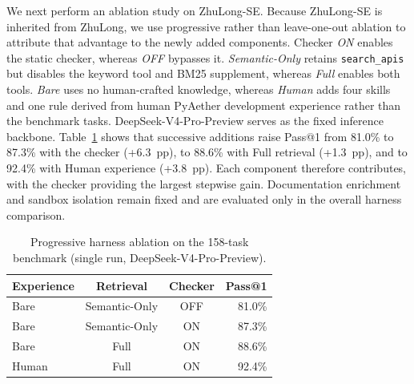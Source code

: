 We next perform an ablation study on ZhuLong-SE. Because ZhuLong-SE is inherited from ZhuLong, we use progressive rather than leave-one-out ablation to attribute that advantage to the newly added components. Checker \emph{ON} enables the static checker, whereas \emph{OFF} bypasses it. \emph{Semantic-Only} retains \texttt{search\_apis} but disables the keyword tool and BM25 supplement, whereas \emph{Full} enables both tools. \emph{Bare} uses no human-crafted knowledge, whereas \emph{Human} adds four skills and one rule derived from human PyAether development experience rather than the benchmark tasks. DeepSeek-V4-Pro-Preview serves as the fixed inference backbone. Table~\ref{tab:ablation} shows that successive additions raise Pass@1 from 81.0\% to 87.3\% with the checker (+6.3~pp), to 88.6\% with Full retrieval (+1.3~pp), and to 92.4\% with Human experience (+3.8~pp). Each component therefore contributes, with the checker providing the largest stepwise gain. Documentation enrichment and sandbox isolation remain fixed and are evaluated only in the overall harness comparison.

\begin{table}[ht]
\caption{Progressive harness ablation on the 158-task benchmark (single run, DeepSeek-V4-Pro-Preview).}
\label{tab:ablation}
\centering
\small
\begin{tabular}{lccr}
\toprule
Experience & Retrieval & Checker & Pass@1 \\
\midrule
Bare  & Semantic-Only & OFF & 81.0\% \\
Bare  & Semantic-Only & ON & 87.3\% \\
Bare  & Full          & ON & 88.6\% \\
Human & Full          & ON & 92.4\% \\
\bottomrule
\end{tabular}
\end{table}

